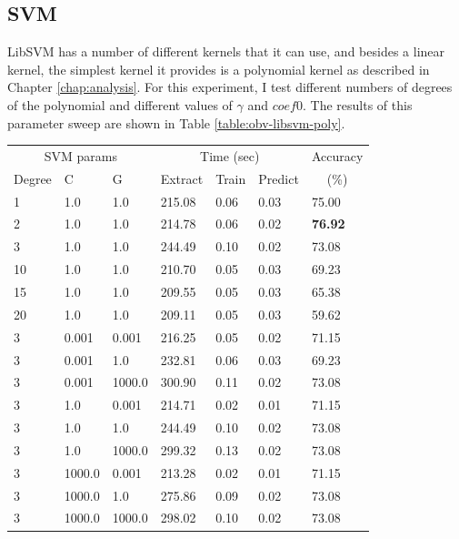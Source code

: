 %
%
\subsection{SVM}

LibSVM has a number of different kernels that it can use, and besides
a linear kernel, the simplest kernel it provides is a polynomial
kernel as described in Chapter \ref{chap:analysis}.  For this
experiment, I test different numbers of degrees of the polynomial and
different values of $\gamma$ and $coef0$.  The results of this parameter
sweep are shown in Table \ref{table:obv-libsvm-poly}.

\begin{table}
\begin{tabular}{|l|l|l|l|l|l|l|}
\hline
\multicolumn{3}{|c|}{SVM params} & \multicolumn{3}{c|}{Time (sec)} & Accuracy \\
\hhline{|-|-|-|-|-|-|~|}
Degree & C & G & Extract & Train & Predict & \multicolumn{1}{c|}{(\%)} \\
\hhline{|=|=|=|=|=|=|=|}
1  & 1.0    & 1.0     &  215.08  &  0.06  &  0.03  &  75.00  \\
2  & 1.0    & 1.0     &  214.78  &  0.06  &  0.02  &  \textbf{76.92}  \\
3  & 1.0    & 1.0     &  244.49  &  0.10  &  0.02  &  73.08  \\
10 & 1.0    & 1.0     &  210.70  &  0.05  &  0.03  &  69.23  \\
15 & 1.0    & 1.0     &  209.55  &  0.05  &  0.03  &  65.38  \\
20 & 1.0    & 1.0     &  209.11  &  0.05  &  0.03  &  59.62  \\
\hline
3  & 0.001  & 0.001   &  216.25  &  0.05  &  0.02  &  71.15  \\
3  & 0.001  & 1.0     &  232.81  &  0.06  &  0.03  &  69.23  \\
3  & 0.001  & 1000.0  &  300.90  &  0.11  &  0.02  &  73.08  \\
3  & 1.0    & 0.001   &  214.71  &  0.02  &  0.01  &  71.15  \\
3  & 1.0    & 1.0     &  244.49  &  0.10  &  0.02  &  73.08  \\
3  & 1.0    & 1000.0  &  299.32  &  0.13  &  0.02  &  73.08  \\
3  & 1000.0 & 0.001   &  213.28  &  0.02  &  0.01  &  71.15  \\
3  & 1000.0 & 1.0     &  275.86  &  0.09  &  0.02  &  73.08  \\
3  & 1000.0 & 1000.0  &  298.02  &  0.10  &  0.02  &  73.08  \\

\end{tabular}
\end{table}
